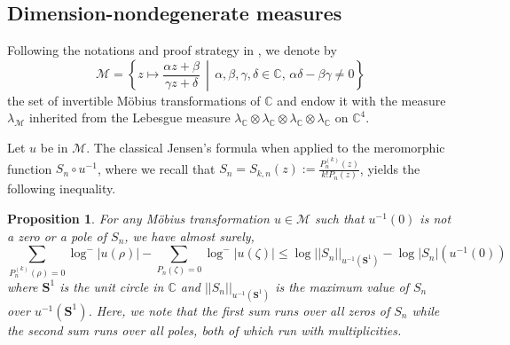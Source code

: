 \documentclass[12pt, reqno]{amsart}
\theoremstyle{plain}
\newtheorem{proposition}[theorem]{Proposition}
\theoremstyle{definition}
\newcommand\C{{\mathbb{C}}}
\begin{document}
 
 
 
 \subsection{Dimension-nondegenerate measures}\label{sec:proof:mu}
Following the notations and proof strategy in \cite{angst2024almost}, we denote by 
 \[
 \mathcal{M} = \left\{ z \mapsto \frac{\alpha z + \beta}{\gamma z + \delta} 
 \,\middle|\, \alpha, \beta, \gamma, \delta \in \mathbb{C},\, \alpha\delta - \beta\gamma \neq 0 \right\}
 \]
 the set of invertible Möbius transformations of $\mathbb{C}$ and endow it with the measure $\lambda_{\mathcal{M}}$ inherited from 
 the Lebesgue measure $\lambda_{\mathbb{C}} \otimes \lambda_{\mathbb{C}} \otimes 
 \lambda_{\mathbb{C}} \otimes \lambda_{\mathbb{C}}$ on $\mathbb{C}^4$.
 
 Let $u$ be in $\mathcal M$. The classical Jensen's formula when applied to the meromorphic function $S_n\circ u^{-1}$, where we recall that $S_n =	S_{k, n}(z):= \frac{P^{(k)}_n(z)}{k!P_n(z)}$, yields the following inequality.
 \begin{proposition}\cite[Proposition 2.2]{angst2024almost}
 	For any Möbius transformation $u \in \mathcal{M}$ such that $u^{-1}(0)$ is not a zero or a pole of $S_n$, we have almost surely,
 	\begin{equation}\label{eq:Jensen:n}
 		\sum_{P_n^{(k)}(\rho)=0} \log^{-} |u(\rho)| - 	\sum_{P_n(\zeta)=0} \log^{-} |u(\zeta)|\le \log||S_n||_{u^{-1}(\mathbf S^1)} - \log |S_n|(u^{-1}(0))
 	\end{equation}
 	where $\mathbf S^1$ is the unit circle in $\C$ and $||S_n||_{u^{-1}(\mathbf S^1)}$ is the maximum value of $S_n$ over $u^{-1}(\mathbf S^1)$. Here, we note that the first sum runs over all zeros of $S_n$ while the second sum runs over all poles, both of which run with multiplicities.
 \end{proposition}
 
\end{document}
